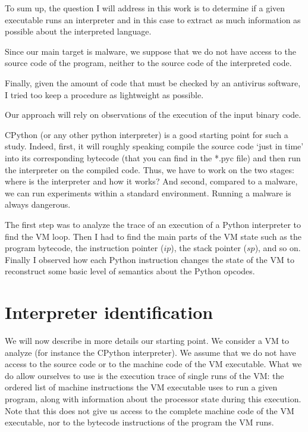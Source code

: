 \documentclass[english]{article}
\begin{document}
To sum up, the question I will address in this work is to determine if a given executable runs an interpreter and in this case to extract as much information as possible about the interpreted language.

Since our main target is malware, we suppose that we do not have access to the source code of the program, neither to the source code of the interpreted code.

Finally, given the amount of code that must be checked by an antivirus software, I tried too keep a procedure as lightweight as possible.

Our approach will rely on observations of the execution of the
input binary code.

CPython (or any other python interpreter) is a good starting point for
such a study. Indeed, first, it will roughly speaking compile the source code
`just in time' into its corresponding bytecode (that you can find in the *.pyc
file) and then run the interpreter on the compiled code. Thus, we have to
work on the two stages: where is the interpreter and how it works? And second, compared to a malware, we can run experiments within a standard environment. Running a malware is always dangerous.

The first step was to analyze the trace of an execution of a Python interpreter to find the VM loop. Then I had to find the main parts of the VM state such as the program bytecode, the instruction pointer ($ip$), the stack pointer ($sp$), and so on. Finally I observed how each Python instruction changes the state of the VM to reconstruct some basic level of semantics about the Python opcodes.

\section{Interpreter identification}

We will now describe in more details our starting point. We consider a VM to analyze (for instance the CPython interpreter). We assume that we do not have access to the source code or to the machine code of the VM executable. What we do allow ourselves to use is the execution trace of single runs of the VM: the ordered list of machine instructions the VM executable uses to run a given program, along with information about the processor state during this execution. Note that this does not give us access to the complete machine code of the VM executable, nor to the bytecode instructions of the program the VM runs. 
\end{document}
